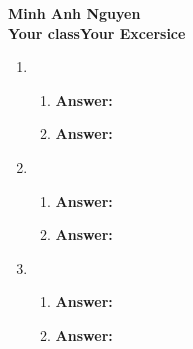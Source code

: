 \documentclass[12pt]{article}
\begin{document}
\textbf{Minh Anh Nguyen }\\
\textbf{Your class\hfill Your Excersice}

\hrulefill

\begin{enumerate}

  \item
        \begin{enumerate}
          \item

                \textbf{Answer:}

          \item

                \textbf{Answer:}

        \end{enumerate}

  \item
        \begin{enumerate}
          \item

                \textbf{Answer:}

          \item

                \textbf{Answer:}

        \end{enumerate}

  \item
        \begin{enumerate}
          \item

                \textbf{Answer:}

          \item

                \textbf{Answer:}

        \end{enumerate}
\end{enumerate}
\end{document}
